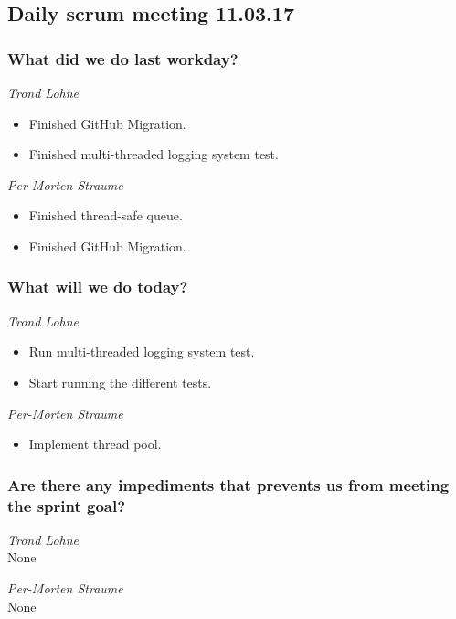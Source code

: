 \documentclass{article}
\begin{document}
\begin{center}
\subsection*{Daily scrum meeting 11.03.17}
\end{center}
\bigskip


\subsubsection*{What did we do last workday?}

\noindent\textit{Trond Lohne}
\begin{itemize}
	\item 
	Finished GitHub Migration.
	
	\item 
	Finished multi-threaded logging system test.
\end{itemize}

\medskip

\noindent\textit{Per-Morten Straume}
\begin{itemize}
	\item 
	Finished thread-safe queue.
	
	\item 
	Finished GitHub Migration.
\end{itemize}


\subsubsection*{What will we do today?}

\noindent\textit{Trond Lohne}
\begin{itemize}
	\item 
	Run multi-threaded logging system test.
	
	\item 
	Start running the different tests.
\end{itemize}

\medskip

\noindent\textit{Per-Morten Straume}
\begin{itemize}
	\item 
	Implement thread pool.
\end{itemize}


\subsubsection*{Are there any impediments that prevents us from meeting the sprint goal?}

\noindent\textit{Trond Lohne}\\
None

\medskip

\noindent\textit{Per-Morten Straume}\\
None
\end{document}
